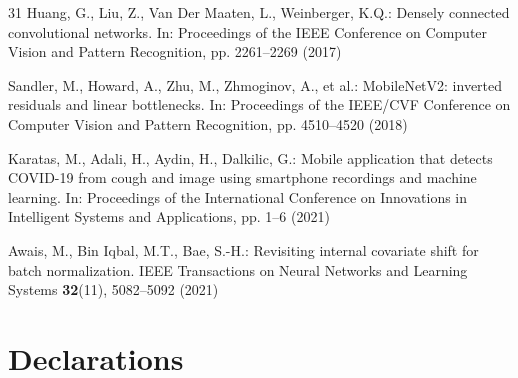 \documentclass[pdflatex,sn-mathphys-num]{sn-jnl}
\begin{document}
\begin{thebibliography}{31}
Huang, G., Liu, Z., Van Der Maaten, L., Weinberger, K.Q.: Densely connected
convolutional networks. In: Proceedings of the IEEE Conference on Computer
Vision and Pattern Recognition, pp. 2261--2269 (2017)

Sandler, M., Howard, A., Zhu, M., Zhmoginov, A., et al.: MobileNetV2: inverted
residuals and linear bottlenecks. In: Proceedings of the IEEE/CVF Conference
on Computer Vision and Pattern Recognition, pp. 4510--4520 (2018)

Karatas, M., Adali, H., Aydin, H., Dalkilic, G.: Mobile application that
detects COVID-19 from cough and image using smartphone recordings and machine
learning. In: Proceedings of the International Conference on Innovations in
Intelligent Systems and Applications, pp. 1--6 (2021)

Awais, M., Bin Iqbal, M.T., Bae, S.-H.: Revisiting internal covariate shift
for batch normalization. IEEE Transactions on Neural Networks and Learning
Systems \textbf{32}(11), 5082--5092 (2021)

\end{thebibliography}

\section*{Declarations}
\end{document}
